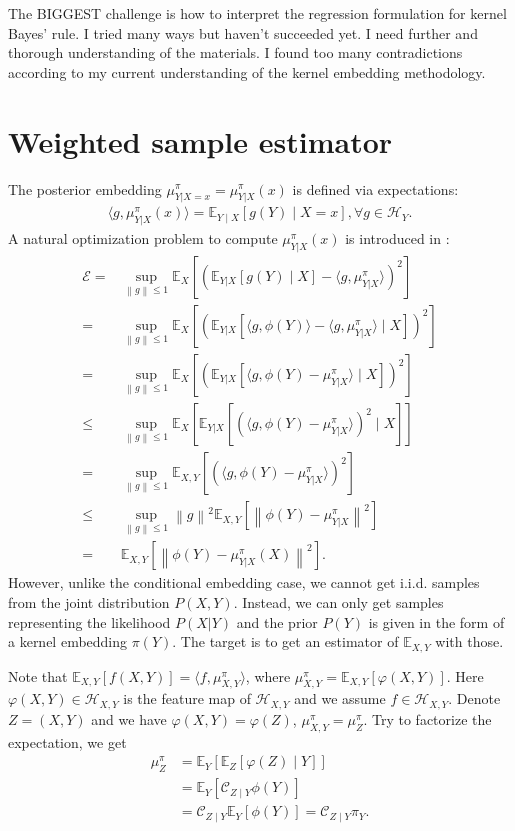 \documentclass[a4paper]{article}
\renewcommand{\cal}{\mathcal}
\newcommand{\bb}{\mathbb}
\newcommand{\norm}[1]{\left\lVert#1\right\rVert}
\begin{document}
The BIGGEST challenge is how to interpret the regression formulation for kernel Bayes' rule. I tried many ways but haven't succeeded yet. I need further and thorough understanding of the materials. I found too many contradictions according to my current understanding of the  kernel embedding methodology.


\section{Weighted sample estimator}
The posterior embedding $\mu_{Y|X=x}^\pi = \mu_{Y|X}^\pi(x)$ is defined via expectations:
\begin{align}
\langle g,\mu_{Y|X}^\pi(x) \rangle = \bb{E}_{Y\mid X}[g(Y)\mid X = x],\forall g\in\cal{H}_Y.
\end{align}
A natural optimization problem to compute $\mu_{Y|X}^\pi(x)$ is introduced in \cite{lever2012conditional}:
\begin{align*}
\cal{E}=&\sup_{\norm{g}\leq 1} \bb{E}_{X}[(\bb{E}_{Y|X}[g(Y)\mid X]-\langle g,\mu_{Y|X}^\pi\rangle)^2]\\
=&\sup_{\norm{g}\leq 1} \bb{E}_{X}[(\bb{E}_{Y|X}[\langle g,\phi(Y)\rangle-\langle g,\mu_{Y|X}^\pi\rangle\mid X])^2]\\
=&\sup_{\norm{g}\leq 1} \bb{E}_{X}[(\bb{E}_{Y|X}[\langle g,\phi(Y)-\mu_{Y|X}^\pi\rangle\mid X])^2]\\
\leq & \sup_{\norm{g}\leq 1} \bb{E}_{X}[\bb{E}_{Y|X}[(\langle g,\phi(Y)-\mu_{Y|X}^\pi\rangle)^2\mid X]]\tag{Jensen's inequality}\\
=&\sup_{\norm{g}\leq 1} \bb{E}_{X,Y}[(\langle g,\phi(Y)-\mu_{Y|X}^\pi\rangle)^2]\\
\leq &\sup_{\norm{g}\leq 1} \norm{g}^2 \bb{E}_{X,Y}[\norm{\phi(Y)-\mu_{Y|X}^\pi}^2]\tag{Cauchy-Schwarz inequality}\\
=&\bb{E}_{X,Y}[\norm{\phi(Y)-\mu_{Y|X}^\pi(X)}^2].
\end{align*}
However, unlike the conditional embedding case, we cannot get i.i.d. samples from the joint distribution $P(X,Y)$. Instead, we can only get samples representing the likelihood $P(X|Y)$ and the prior $P(Y)$ is given in the form of a kernel embedding $\pi(Y)$. The target is to get an estimator of $\bb{E}_{X,Y}$ with those.

Note that $\bb{E}_{X,Y}[f(X,Y)] = \langle f, \mu_{X,Y}^\pi \rangle$, where $\mu_{X,Y}^\pi = \bb{E}_{X,Y}[\varphi(X,Y)]$. Here $\varphi(X,Y) \in \cal{H}_{X,Y}$ is the feature map of $\cal{H}_{X,Y}$ and we assume $f \in \cal{H}_{X,Y}$. Denote $Z = (X,Y)$ and we have $\varphi(X,Y) = \varphi(Z)$, $\mu_{X,Y}^\pi = \mu_Z^\pi$. Try to factorize the expectation, we get
\begin{align*}
\mu_{Z}^\pi &= \bb{E}_{Y}[\bb{E}_{Z}[\varphi(Z)\mid Y]]\\
&=\bb{E}_{Y}[\cal{C}_{Z\mid Y}\phi(Y)]\\
&= \cal{C}_{Z\mid Y} \bb{E}_{Y}[\phi(Y)] = \cal{C}_{Z\mid Y} \pi_Y.
\end{align*}
\end{document}
